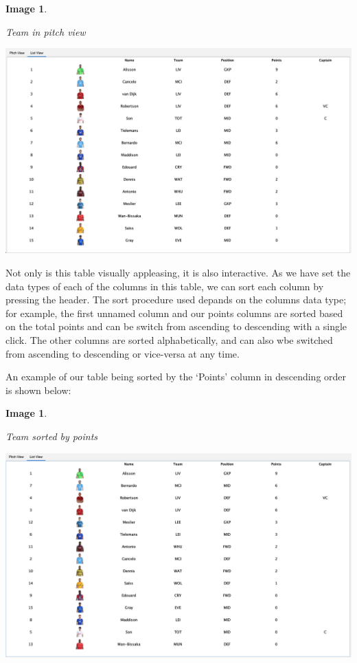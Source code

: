 \documentclass[12pt, a4paper, oneside]{book}
\newtheorem{image}[theorem]{Image}
\numberwithin{equation}{section}
\begin{document}
\begin{image} \label{Team in pitch view}

  Team in pitch view

  \vspace{0.5cm}

  \centerline{\includegraphics[width=1\textwidth]{images/gui/fantasy-tab/team-list-view.png}}

\end{image}

Not only is this table visually appleasing, it is also interactive. As we have set the data types of each of the columns in this table, we can sort each column by pressing the header. The sort procedure used depands on the columns data type; for example, the first unnamed column and our points columns are sorted based on the total points and can be switch from ascending to descending with a single click. The other columns are sorted alphabetically, and can also wbe switched from ascending to descending or vice-versa at any time.

An example of our table being sorted by the `Points' column in descending order is shown below:

\begin{image} \label{Team sorted by points}

  Team sorted by points

  \vspace{0.5cm}

  \centerline{\includegraphics[width=1\textwidth]{images/gui/fantasy-tab/team-list-view-sorted.png}}

\end{image}
\end{document}
